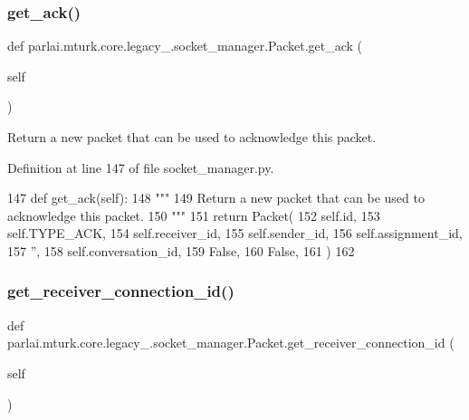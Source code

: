 \subsubsection{\texorpdfstring{get\+\_\+ack()}{get\_ack()}}
{\footnotesize\ttfamily def parlai.\+mturk.\+core.\+legacy\+\_.\+socket\+\_\+manager.\+Packet.\+get\+\_\+ack (\begin{DoxyParamCaption}\item[{}]{self }\end{DoxyParamCaption})}

\begin{DoxyVerb}Return a new packet that can be used to acknowledge this packet.
\end{DoxyVerb}
 

Definition at line 147 of file socket\+\_\+manager.\+py.


\begin{DoxyCode}
147     \textcolor{keyword}{def }get\_ack(self):
148         \textcolor{stringliteral}{"""}
149 \textcolor{stringliteral}{        Return a new packet that can be used to acknowledge this packet.}
150 \textcolor{stringliteral}{        """}
151         \textcolor{keywordflow}{return} Packet(
152             self.id,
153             self.TYPE\_ACK,
154             self.receiver\_id,
155             self.sender\_id,
156             self.assignment\_id,
157             \textcolor{stringliteral}{''},
158             self.conversation\_id,
159             \textcolor{keyword}{False},
160             \textcolor{keyword}{False},
161         )
162 
\end{DoxyCode}
\mbox{\label{classparlai_1_1mturk_1_1core_1_1legacy__2018_1_1socket__manager_1_1Packet_ac2aeaa0f298f1dc750abbbcbd2ced9d6}} 
\subsubsection{\texorpdfstring{get\+\_\+receiver\+\_\+connection\+\_\+id()}{get\_receiver\_connection\_id()}}
{\footnotesize\ttfamily def parlai.\+mturk.\+core.\+legacy\+\_.\+socket\+\_\+manager.\+Packet.\+get\+\_\+receiver\+\_\+connection\+\_\+id (\begin{DoxyParamCaption}\item[{}]{self }\end{DoxyParamCaption})}

